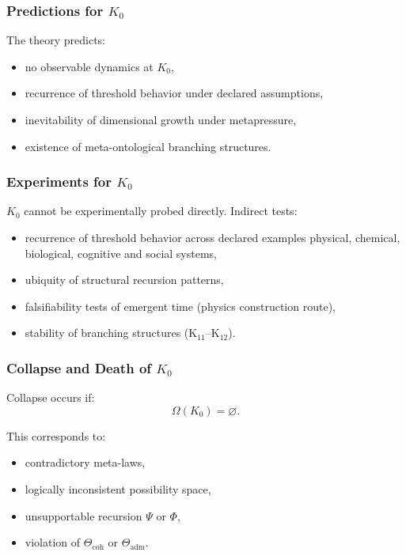 \subsubsection{Predictions for \texorpdfstring{$K_0$}{K_0}}

The theory predicts:
\begin{itemize}
    \item no observable dynamics at $K_0$,
    \item recurrence of threshold behavior under declared assumptions,
    \item inevitability of dimensional growth under metapressure,
    \item existence of meta-ontological branching structures.
\end{itemize}

\subsubsection{Experiments for \texorpdfstring{$K_0$}{K_0}}

$K_0$ cannot be experimentally probed directly.
Indirect tests:
\begin{itemize}
    \item recurrence of threshold behavior across declared examples physical,
          chemical, biological, cognitive and social systems,
    \item ubiquity of structural recursion patterns,
    \item falsifiability tests of emergent time (physics construction route),
    \item stability of branching structures (K$_{11}$–K$_{12}$).
\end{itemize}

\subsubsection{Collapse and Death of \texorpdfstring{$K_0$}{K_0}}

Collapse occurs if:
\[
\Omega(K_0) = \varnothing.
\]

This corresponds to:
\begin{itemize}
    \item contradictory meta-laws,
    \item logically inconsistent possibility space,
    \item unsupportable recursion $\Psi$ or $\Phi$,
    \item violation of $\Theta_{\mathrm{coh}}$ or $\Theta_{\mathrm{adm}}$.
\end{itemize}

